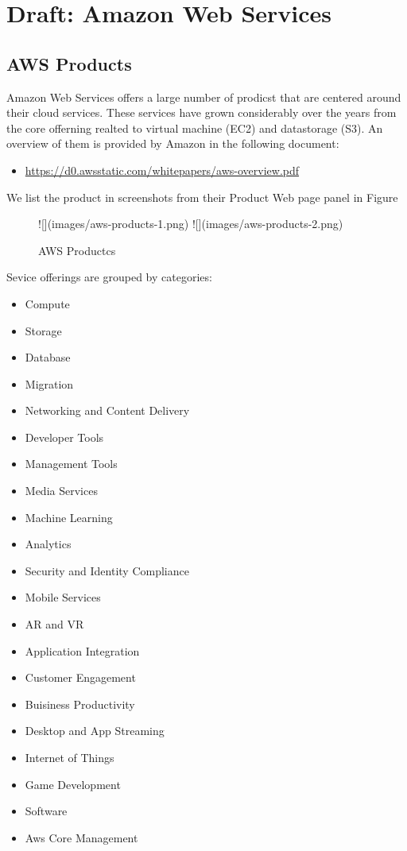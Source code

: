 \MDNAME

\section{Draft: Amazon Web Services}

\label{s:aws} 

\subsection{AWS Products}

Amazon Web Services offers a large number of prodicst that are centered
around their cloud services. These services have grown considerably over
the years from the core offerning realted to virtual machine (EC2) and
datastorage (S3). An overview of them is provided by Amazon in the
following document:

\begin{itemize}
\item
  \url{https://d0.awsstatic.com/whitepapers/aws-overview.pdf}
\end{itemize}

We list the product in screenshots from their Product Web page panel in
Figure \label{F:aws-products}

\begin{figure}
![](images/aws-products-1.png)
![](images/aws-products-2.png)
\caption{AWS Productcs}
\label{F:aws-products}
\end{figure}

Sevice offerings are grouped by categories:

\begin{itemize}
\item
  Compute
\item
  Storage
\item
  Database
\item
  Migration
\item
  Networking and Content Delivery
\item
  Developer Tools
\item
  Management Tools
\item
  Media Services
\item
  Machine Learning
\item
  Analytics
\item
  Security and Identity Compliance
\item
  Mobile Services
\item
  AR and VR
\item
  Application Integration
\item
  Customer Engagement
\item
  Buisiness Productivity
\item
  Desktop and App Streaming
\item
  Internet of Things
\item
  Game Development
\item
  Software
\item
  Aws Core Management
\end{itemize}

